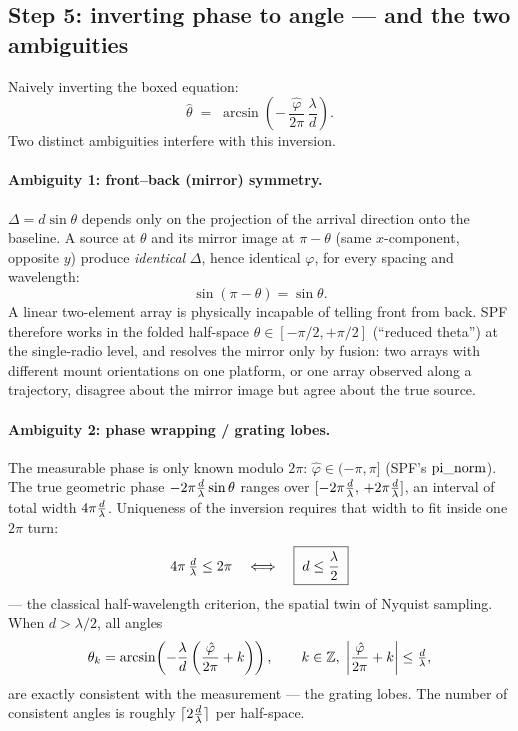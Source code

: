 \subsection{Step 5: inverting phase to angle --- and the two ambiguities}
\label{sec:ambiguity}

Naively inverting the boxed equation:
\[
\hat\theta \;=\; \arcsin\!\left( -\,\frac{\hat\varphi}{2\pi}\,
                                 \frac{\lambda}{d} \right).
\]
Two distinct ambiguities interfere with this inversion.

\paragraph{Ambiguity 1: front--back (mirror) symmetry.}
$\Delta = d\sin\theta$ depends only on the projection of the arrival
direction onto the baseline. A source at $\theta$ and its mirror image at
$\pi - \theta$ (same $x$-component, opposite $y$) produce \emph{identical}
$\Delta$, hence identical $\varphi$, for every spacing and wavelength:
\[
\sin(\pi - \theta) = \sin\theta .
\]
A linear two-element array is physically incapable of telling front from
back. SPF therefore works in the folded half-space
$\theta \in [-\pi/2, +\pi/2]$ (``reduced theta'') at the single-radio level,
and resolves the mirror only by fusion: two arrays with different mount
orientations on one platform, or one array observed along a trajectory,
disagree about the mirror image but agree about the true source.

\paragraph{Ambiguity 2: phase wrapping / grating lobes.}
The measurable phase is only known modulo $2\pi$:
$\hat\varphi \in (-\pi, \pi]$ (SPF's $\operatorname{pi\_norm}$). The true geometric phase
$-2\pi\tfrac{d}{\lambda}\sin\theta$ ranges over $[-2\pi\tfrac{d}{\lambda},\, +2\pi\tfrac{d}{\lambda}]$, an interval
of total width $4\pi\tfrac{d}{\lambda}$. Uniqueness of the inversion requires that width
to fit inside one $2\pi$ turn:
\[
4\pi\,\tfrac{d}{\lambda} \le 2\pi
\quad\Longleftrightarrow\quad
\boxed{\; d \le \frac{\lambda}{2} \;}
\]
--- the classical half-wavelength criterion, the spatial twin of Nyquist
sampling. When $d > \lambda/2$, all angles
\[
\theta_k = \arcsin\!\left( -\frac{\lambda}{d}
           \left( \frac{\hat\varphi}{2\pi} + k \right) \right),
\qquad k \in \mathbb{Z},\;
\left| \frac{\hat\varphi}{2\pi} + k \right| \le \tfrac{d}{\lambda},
\]
are exactly consistent with the measurement --- the grating lobes. The number
of consistent angles is roughly $\lceil 2\tfrac{d}{\lambda} \rceil$ per half-space.

